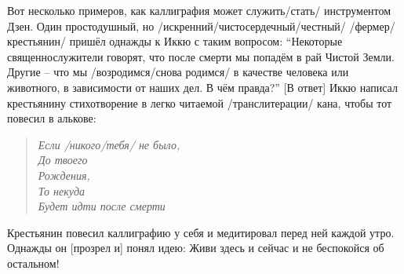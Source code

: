 \begin{ver}
Вот несколько примеров, как каллиграфия может служить/стать/
инструментом Дзен. Один простодушный, но
/искренний/чистосердечный/честный/ /фермер/крестьянин/ пришёл однажды к Иккю с
таким вопросом: ``Некоторые священнослужители говорят, что после
смерти мы попадём в рай Чистой Земли. Другие -- что мы
/возродимся/снова родимся/ в качестве человека или животного, в
зависимости от наших дел. В чём правда?'' [В ответ] Иккю написал крестьянину
стихотворение в легко читаемой /транслитерации/ кана, чтобы тот повесил
в алькове: 
\end{ver}

\begin{ver}
  \begin{verse}\it
    Если /никого/тебя/ не было,\\ 
    До твоего\\
    Рождения,\\
    То некуда\\
    Будет идти после смерти
  \end{verse}
\end{ver}

\begin{ver}
  Крестьянин повесил каллиграфию у себя и медитировал перед ней каждой
  утро. Однажды он [прозрел и] понял идею: Живи здесь и
  сейчас и не беспокойся об остальном!
\end{ver}
